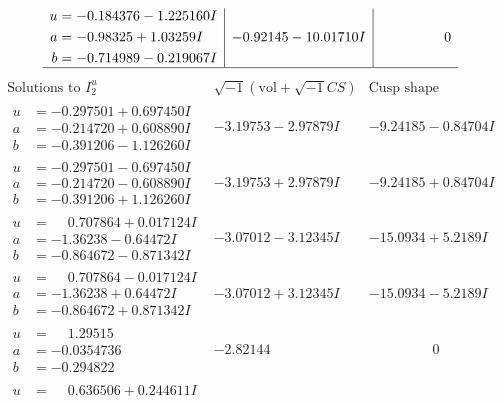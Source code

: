 \documentclass[1p]{elsarticle_modified}
\theoremstyle{definition}
\newcommand{\I}{\sqrt{-1}}
\begin{document}
$$\begin{array}{c|c|c}
\begin{aligned}
u &= -0.184376 - 1.225160 I \\
a &= -0.98325 + 1.03259 I \\
b &= -0.714989 - 0.219067 I\end{aligned}
 & -0.92145 - 10.01710 I & \phantom{-0.000000 } 0\\
 \hline 
 \end{array}$$\newpage$$\begin{array}{c|c|c}  
\text{Solutions to }I^u_{2}& \I (\text{vol} + \sqrt{-1}CS) & \text{Cusp shape}\\
 \hline 
\begin{aligned}
u &= -0.297501 + 0.697450 I \\
a &= -0.214720 + 0.608890 I \\
b &= -0.391206 - 1.126260 I\end{aligned}
 & -3.19753 - 2.97879 I & -9.24185 - 0.84704 I \\ \hline\begin{aligned}
u &= -0.297501 - 0.697450 I \\
a &= -0.214720 - 0.608890 I \\
b &= -0.391206 + 1.126260 I\end{aligned}
 & -3.19753 + 2.97879 I & -9.24185 + 0.84704 I \\ \hline\begin{aligned}
u &= \phantom{-}0.707864 + 0.017124 I \\
a &= -1.36238 - 0.64472 I \\
b &= -0.864672 - 0.871342 I\end{aligned}
 & -3.07012 - 3.12345 I & -15.0934 + 5.2189 I \\ \hline\begin{aligned}
u &= \phantom{-}0.707864 - 0.017124 I \\
a &= -1.36238 + 0.64472 I \\
b &= -0.864672 + 0.871342 I\end{aligned}
 & -3.07012 + 3.12345 I & -15.0934 - 5.2189 I \\ \hline\begin{aligned}
u &= \phantom{-}1.29515\phantom{ +0.000000I} \\
a &= -0.0354736\phantom{ +0.000000I} \\
b &= -0.294822\phantom{ +0.000000I}\end{aligned}
 & -2.82144\phantom{ +0.000000I} & \phantom{-0.000000 } 0 \\ \hline\begin{aligned}
u &= \phantom{-}0.636506 + 0.244611 I \\

\end{aligned}
\end{array}$$
\end{document}
